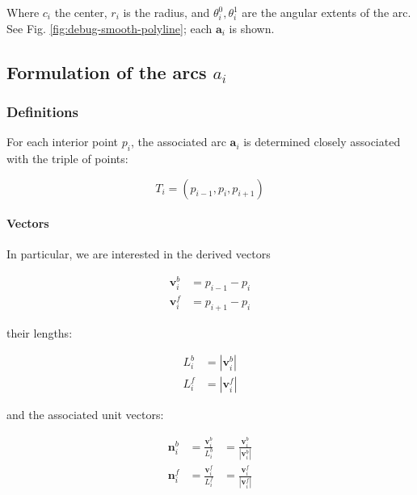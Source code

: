 \documentclass{article}
\begin{document}
Where $c_{i}$ the center, $r_{i}$ is the radius, and $\theta^{0}_{i}, \theta^{1}_{i}$ are the angular extents of the arc.  See Fig. \ref{fig:debug-smooth-polyline}; each $\mathbf{a}_{i}$ is shown.

\subsection{Formulation of the arcs $a_{i}$}

\subsubsection{Definitions}

For each interior point $p_{i}$, the associated arc $\mathbf{a}_{i}$ is determined closely associated with the triple of points:

\begin{equation}
  \label{eq:arc-triple}
  T_{i} = \left(p_{i-1}, p_{i}, p_{i+1}\right)
\end{equation}

\paragraph{Vectors}

In particular, we are interested in the derived vectors

\begin{align}
  \label{eq:vector-b}
  \mathbf{v}^{b}_{i} &= p_{i-1} - p_{i}\\
  \label{eq:vector-f}
  \mathbf{v}^{f}_{i} &= p_{i+1} - p_{i}
\end{align}

their lengths:

\begin{align}
  \label{eq:vector-length-b}
  L^{b}_{i} &= \left|\mathbf{v}^{b}_{i}\right|\\
  \label{eq:vector-length-f}
  L^{f}_{i} &= \left|\mathbf{v}^{f}_{i}\right|
\end{align}

and the associated unit vectors:

\begin{align}
  \label{eq:unit-vector-b}
  \mathbf{n}^{b}_{i} &= \frac{\mathbf{v}^{b}_{i}}{L^{b}_{i}} &=\frac{\mathbf{v}^{b}_{i}}{\left|\mathbf{v}^{b}_{i}\right|}\\
  \label{eq:unit-vectors-f}
  \mathbf{n}^{f}_{i} &= \frac{\mathbf{v}^{f}_{i}}{L^{f}_{i}} &=\frac{\mathbf{v}^{f}_{i}}{\left|\mathbf{v}^{f}_{i}\right|}
\end{align}
\end{document}

